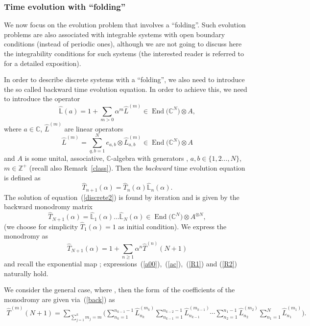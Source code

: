 \documentclass[10pt,a4paper]{amsart}
\numberwithin{equation}{section}
\theoremstyle{definition}
\DeclareMathOperator{\EEnd}{End}%
\def\mathfrak#1{#1}%
\def\mathcal#1{#1}%
\begin{document}
\subsubsection{Time evolution with ``folding''}
We now focus on the evolution problem that involves a ``folding''. Such evolution problems are also associated with integrable systems with open boundary conditions (instead of periodic ones), although we are not going to discuss here the integrability conditions for such systems (the interested reader is referred to~\cite{Sklyanin, Sklyaninb} for a detailed exposition).


In order to describe discrete systems with a ``folding'', we also need to introduce the so called backward time evolution equation. In order to achieve this, we need to introduce the operator
\[
\hat {\mathbb L}(a)= 1 + \sum_{m>0} \alpha^m \hat L^{(m)} \in \EEnd\bigl({\mathbb C}^{\mathcal N}\bigr) \otimes {\mathfrak A},
\]
where $a\in {\mathbb C}$, $\hat L^{(m)}$ are linear operators
\[
\hat L^{(m)} = \sum_{q,b =1}^{{\mathcal N}} e_{a,b} \otimes \hat L_{a,b}^{(m)} \in \EEnd\bigl({\mathbb C}^{\mathcal N}\bigr) \otimes {\mathfrak A}
\]
 and ${\mathfrak A}$ is some unital, associative, ${\mathbb C}$-algebra with generators , $a,b \in \{1,2 \dots ,{\mathcal N}\}$, $m \in {\mathbb Z}^+$ (recall also Remark~\ref{class}).
Then the {\it backward} time evolution equation is defined as
\begin{equation}
\hat T_{n+1}(\alpha) = \hat T_{n}(\alpha) \hat {\mathbb L}_n(\alpha). \label{discrete2}
\end{equation}
The solution of equation~(\ref{discrete2}) is found by iteration and is given by the backward monodromy matrix
\begin{equation}
\hat T_{N+1}(\alpha) = \hat {\mathbb L}_{1}(\alpha) \dots \hat {\mathbb L}_{N}(\alpha) \in \EEnd\bigl({\mathbb C}^{\mathcal N}\bigr) \otimes {\mathfrak A}^{\otimes N}, \label{back}
\end{equation}
(we choose for simplicity $\hat T_1(\alpha) = 1$ as initial condition).
We express the monodromy as
\[
\hat T_{N+1}(\alpha)=1 + \sum_{n\geq 1} \alpha^n \hat T^{(n)}(N+1)
\]
and recall the exponential map
\smash{$\hat T_{N+1}(\alpha) = {\rm e}^{\hat {\mathcal Q}_{N+1}(\alpha)}$};
{expressions}~(\ref{a00}),~(\ref{ac}),~(\ref{R1}) and (\ref{R2}) naturally hold.

We consider the general case, where , then the form~of the coefficients of the monodromy  are given via~(\ref{back}) as
\begin{gather}
\hat T^{(m)}(N+1)= \sum_{\sum_{j=1}^km_j=m}\Biggl( \sum_{n_{k}=1}^{n_{k-1}-1 }\hat L_{n_k}^{(m_k)} \sum_{n_{k-1}=1}^{n_{k-2}-1 }\hat L^{(m_{k-1})}_{n_{k-1}} \cdots \sum_{n_{2}=1}^{n_1-1 }\hat L^{(m_2)}_{n_2}\sum_{n_1=1}^N \hat L^{(m_1)}_{n_1}\Biggr). \label{tt2b}
\end{gather}
\end{document}
